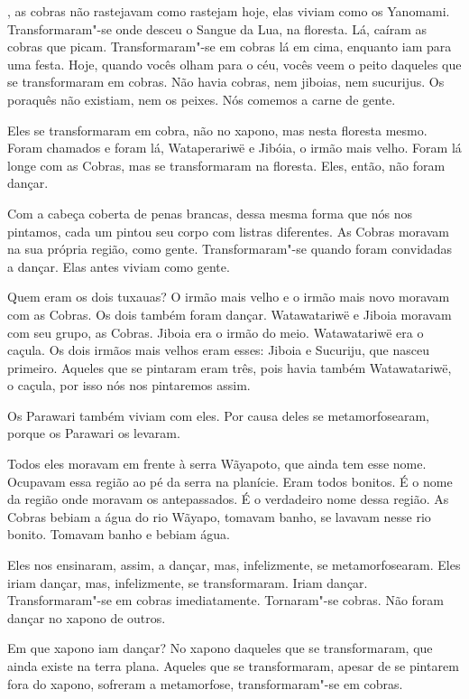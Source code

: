  

, as cobras não rastejavam como rastejam hoje, elas
viviam como os Yanomami. Transformaram"-se onde desceu o Sangue da Lua,
na floresta. Lá, caíram as cobras que picam. Transformaram"-se em cobras
lá em cima, enquanto iam para uma festa. Hoje, quando vocês olham para o
céu, vocês veem o peito daqueles que se transformaram em cobras. Não
havia cobras, nem jiboias, nem sucurijus. Os poraquês não existiam, nem
os peixes. Nós comemos a carne de gente.

Eles se transformaram em cobra, não no xapono, mas nesta floresta mesmo.
Foram chamados e foram lá, Wataperariwë e Jibóia, o irmão mais velho.
Foram lá longe com as Cobras, mas se transformaram na floresta. Eles,
então, não foram dançar. 

Com a cabeça coberta de penas brancas, dessa mesma forma que nós nos
pintamos, cada um pintou seu corpo com listras diferentes. As Cobras
moravam na sua própria região, como gente. Transformaram"-se quando
foram convidadas a dançar. Elas antes viviam como gente. 

Quem eram os dois tuxauas? O irmão mais velho e o irmão mais novo
moravam com as Cobras. Os dois também foram dançar. Watawatariwë e
Jiboia moravam com seu grupo, as Cobras. Jiboia era o irmão do meio.
Watawatariwë era o caçula. Os dois irmãos mais velhos eram esses: Jiboia
e Sucuriju, que nasceu primeiro. Aqueles que se pintaram eram três, pois
havia também Watawatariwë, o caçula, por isso nós nos pintaremos assim. 

Os Parawari também viviam com eles. Por causa deles se metamorfosearam,
porque os Parawari os levaram. 

Todos eles moravam em frente à serra Wãyapoto, que ainda tem esse nome.
Ocupavam essa região ao pé da serra na planície. Eram todos bonitos. É o
nome da região onde moravam os antepassados. É o verdadeiro nome dessa
região. As Cobras bebiam a água do rio Wãyapo, tomavam banho, se lavavam
nesse rio bonito. Tomavam banho e bebiam água. 

Eles nos ensinaram, assim, a dançar, mas, infelizmente, se
metamorfosearam. Eles iriam dançar, mas, infelizmente, se transformaram.
Iriam dançar. Transformaram"-se em cobras imediatamente. Tornaram"-se
cobras. Não foram dançar no xapono de outros. 

Em que xapono iam dançar? No xapono daqueles que se transformaram, que ainda existe na terra plana. Aqueles que se transformaram, apesar de se
pintarem fora do xapono, sofreram a metamorfose, transformaram"-se em
cobras. 

